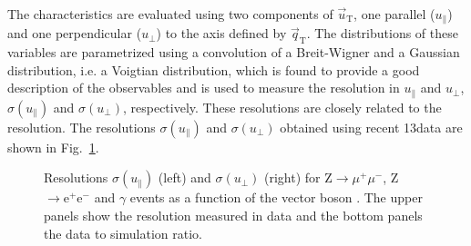 The \MET characteristics are evaluated using two components of $\vec{u}_\mathrm{T}$, one parallel ($u_\parallel$) and one perpendicular ($u_\perp$) to the axis defined by $\vec{q}_\mathrm{T}$. The distributions of these variables are parametrized using a convolution of a Breit-Wigner and a Gaussian distribution, i.e. a Voigtian distribution, which is found to provide a good description of the observables and is used to measure the resolution in $u_\parallel$ and $u_\perp$, $\sigma(u_\parallel)$ and $\sigma(u_\perp)$, respectively. These resolutions are closely related to the \MET resolution. The resolutions $\sigma(u_\parallel)$ and $\sigma(u_\perp)$ obtained using recent 13\TeV data are shown in Fig.~\ref{fig:metres}.

\begin{figure}[htb]
\centering
{}
\caption{Resolutions $\sigma(u_\parallel)$ (left) and $\sigma(u_\perp)$ (right) for Z$\to\mu^+\mu^-$, Z$\to\mathrm{e^+ e^-}$ and $\gamma$ events as a function of the vector boson \pt. The upper panels show the resolution measured in data and the bottom panels the data to simulation ratio.}\label{fig:metres}
\end{figure}

